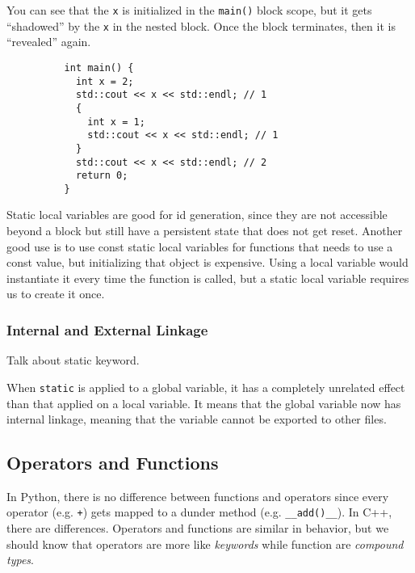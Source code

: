 \documentclass{article}
\begin{document}
      \begin{example}
        You can see that the \texttt{x} is initialized in the \texttt{main()} block scope, but it gets ``shadowed'' by the \texttt{x} in the nested block. Once the block terminates, then it is ``revealed'' again. 

        \begin{lstlisting}
          int main() {  
            int x = 2; 
            std::cout << x << std::endl; // 1
            {
              int x = 1;
              std::cout << x << std::endl; // 1
            }
            std::cout << x << std::endl; // 2 
            return 0; 
          }
        \end{lstlisting}
      \end{example} 

      Static local variables are good for id generation, since they are not accessible beyond a block but still have a persistent state that does not get reset. Another good use is to use const static local variables for functions that needs to use a const value, but initializing that object is expensive. Using a local variable would instantiate it every time the function is called, but a static local variable requires us to create it once. 

    \subsubsection{Internal and External Linkage} 

      Talk about static keyword. 

      When \texttt{static} is applied to a global variable, it has a completely unrelated effect than that applied on a local variable. It means that the global variable now has internal linkage, meaning that the variable cannot be exported to other files. 

  \subsection{Operators and Functions} 

    In Python, there is no difference between functions and operators since every operator (e.g. \texttt{+}) gets mapped to a dunder method (e.g. \texttt{\_\_add()\_\_}). In C++, there are differences. Operators and functions are similar in behavior, but we should know that operators are more like \textit{keywords} while function are \textit{compound types}. 
    
\end{document}
